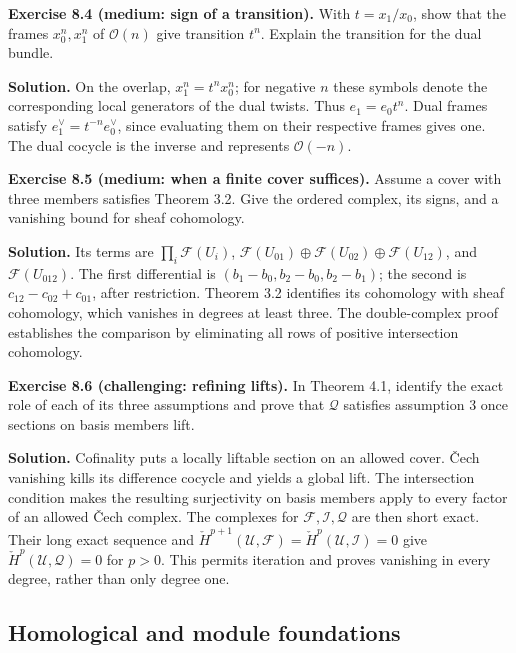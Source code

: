 \documentclass[11pt]{article}
\begin{document}
\textbf{Exercise 8.4 (medium: sign of a transition).} With
\(t=x_1/x_0\), show that the frames \(x_0^n,x_1^n\) of \(\mathcal O(n)\)
give transition \(t^n\). Explain the transition for the dual bundle.

\textbf{Solution.} On the overlap, \(x_1^n=t^n x_0^n\); for negative
\(n\) these symbols denote the corresponding local generators of the
dual twists. Thus \(e_1=e_0t^n\). Dual frames satisfy
\(e_1^\vee=t^{-n}e_0^\vee\), since evaluating them on their respective
frames gives one. The dual cocycle is the inverse and represents
\(\mathcal O(-n)\).

\textbf{Exercise 8.5 (medium: when a finite cover suffices).} Assume a
cover with three members satisfies Theorem 3.2. Give the ordered
complex, its signs, and a vanishing bound for sheaf cohomology.

\textbf{Solution.} Its terms are \(\prod_i\mathcal F(U_i)\),
\(\mathcal F(U_{01})\oplus\mathcal F(U_{02})\oplus\mathcal F(U_{12})\),
and \(\mathcal F(U_{012})\). The first differential is
\((b_1-b_0,b_2-b_0,b_2-b_1)\); the second is \(c_{12}-c_{02}+c_{01}\),
after restriction. Theorem 3.2 identifies its cohomology with sheaf
cohomology, which vanishes in degrees at least three. The double-complex
proof establishes the comparison by eliminating all rows of positive
intersection cohomology.

\textbf{Exercise 8.6 (challenging: refining lifts).} In Theorem 4.1,
identify the exact role of each of its three assumptions and prove that
\(\mathcal Q\) satisfies assumption 3 once sections on basis members
lift.

\textbf{Solution.} Cofinality puts a locally liftable section on an
allowed cover. Čech vanishing kills its difference cocycle and yields a
global lift. The intersection condition makes the resulting surjectivity
on basis members apply to every factor of an allowed Čech complex. The
complexes for \(\mathcal F,\mathcal I,\mathcal Q\) are then short exact.
Their long exact sequence and
\(\check H^{p+1}(\mathcal U,\mathcal F)=\check H^p(\mathcal U,\mathcal I)=0\)
give \(\check H^p(\mathcal U,\mathcal Q)=0\) for \(p>0\). This permits
iteration and proves vanishing in every degree, rather than only degree
one.

\subsection{Homological and module
foundations}\label{homological-and-module-foundations}
\end{document}
